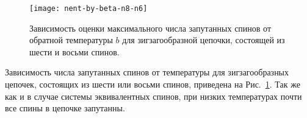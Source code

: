 \begin{figure}[H]
  \centering
  \texttt{[image: nent-by-beta-n8-n6]}
  \caption{
    Зависимость оценки максимального числа запутанных спинов от обратной температуры $b$
    для зигзагообразной цепочки,
    состоящей из шести и восьми спинов.
    }
    \label{fig:fig7}
\end{figure}

Зависимость числа запутанных спинов от температуры для зигзагообразных цепочек,
состоящих из шести или восьми спинов, приведена на Рис.~\ref{fig:fig7}.
Так же как и в случае системы эквивалентных спинов,
при низких температурах почти все спины в цепочке запутанны.


%
%



